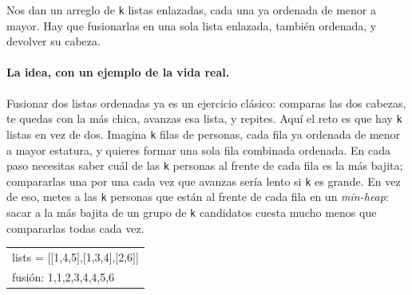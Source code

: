 
Nos dan un arreglo de \texttt{k} listas enlazadas, cada una ya ordenada de
menor a mayor. Hay que fusionarlas en una sola lista enlazada, también
ordenada, y devolver su cabeza.

\paragraph{La idea, con un ejemplo de la vida real.} Fusionar dos listas
ordenadas ya es un ejercicio clásico: comparas las dos cabezas, te quedas
con la más chica, avanzas esa lista, y repites. Aquí el reto es que hay
\texttt{k} listas en vez de dos. Imagina \texttt{k} filas de personas, cada
fila ya ordenada de menor a mayor estatura, y quieres formar una sola fila
combinada ordenada. En cada paso necesitas saber cuál de las \texttt{k}
personas al frente de cada fila es la más bajita; compararlas una por una
cada vez que avanzas sería lento si \texttt{k} es grande. En vez de eso,
metes a las \texttt{k} personas que están al frente de cada fila en un
\emph{min-heap}: sacar a la más bajita de un grupo de \texttt{k} candidatos
cuesta mucho menos que compararlas todas cada vez.

\begin{center}
\ttfamily
\begin{tabular}{l}
lists = [[1,4,5],[1,3,4],[2,6]]\\
fusión: 1,1,2,3,4,4,5,6\\
\end{tabular}
\end{center}

